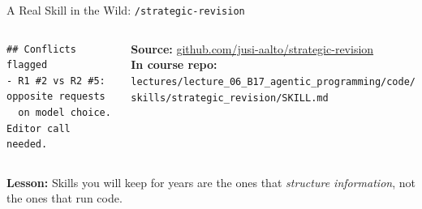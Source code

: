 \documentclass[aspectratio=169,10pt]{beamer}
\begin{document}
\begin{frame}[fragile]{A Real Skill in the Wild: \texttt{/strategic-revision}}
\begin{columns}[T]
\begin{lstlisting}[basicstyle=\tiny\ttfamily, frame=single]
## Conflicts flagged
- R1 #2 vs R2 #5: opposite requests
  on model choice. Editor call needed.
\end{lstlisting}

\vspace{0.2em}
\textbf{Source:} \href{https://github.com/jusi-aalto/strategic-revision}{github.com/jusi-aalto/strategic-revision}\\
\textbf{In course repo:} \texttt{lectures/lecture\_06\_B17\_agentic\_programming/code/}\\
\phantom{xx}\texttt{skills/strategic\_revision/SKILL.md}
\end{columns}

\vspace{0.2em}
\textbf{Lesson:} Skills you will keep for years are the ones that
\emph{structure information}, not the ones that run code.
\end{frame}
\end{document}
